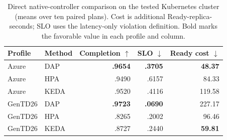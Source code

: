 \begin{table}[t]
\caption{Direct native-controller comparison on the tested Kubernetes cluster
(means over ten paired plans). Cost is additional Ready-replica-seconds; SLO
uses the latency-only violation definition. Bold marks the favorable
value in each profile and column.}
\label{tab:k8s-cross}
\small
\begin{tabular}{llrrr}
\toprule
Profile & Method & Completion $\uparrow$ & SLO $\downarrow$ & Ready cost $\downarrow$\\
\midrule
Azure & DAP & \textbf{.9654} & \textbf{.3705} & \textbf{48.37}\\
Azure & HPA & .9490 & .6157 & 84.33\\
Azure & KEDA & .9520 & .4116 & 119.58\\
\midrule
GenTD26 & DAP & \textbf{.9723} & \textbf{.0690} & 227.17\\
GenTD26 & HPA & .8265 & .2002 & 96.46\\
GenTD26 & KEDA & .8727 & .2440 & \textbf{59.81}\\
\bottomrule
\end{tabular}
\end{table}
